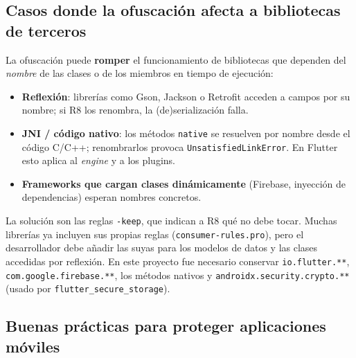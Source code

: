 \documentclass[12pt,letterpaper]{article}
\begin{document}
\subsection{Casos donde la ofuscación afecta a bibliotecas de terceros}

La ofuscación puede \textbf{romper} el funcionamiento de bibliotecas que dependen
del \emph{nombre} de las clases o de los miembros en tiempo de ejecución:

\begin{itemize}[leftmargin=1.4em]
  \item \textbf{Reflexión}: librerías como Gson, Jackson o Retrofit acceden a
        campos por su nombre; si R8 los renombra, la (de)serialización falla.
  \item \textbf{JNI / código nativo}: los métodos \texttt{native} se resuelven
        por nombre desde el código C/C++; renombrarlos provoca
        \texttt{UnsatisfiedLinkError}. En Flutter esto aplica al \emph{engine} y
        a los plugins.
  \item \textbf{Frameworks que cargan clases dinámicamente} (Firebase, inyección
        de dependencias) esperan nombres concretos.
\end{itemize}

La solución son las reglas \texttt{-keep}, que indican a R8 qué no debe tocar.
Muchas librerías ya incluyen sus propias reglas (\texttt{consumer-rules.pro}),
pero el desarrollador debe añadir las suyas para los modelos de datos y las
clases accedidas por reflexión. En este proyecto fue necesario conservar
\texttt{io.flutter.**}, \texttt{com.google.firebase.**}, los métodos nativos y
\texttt{androidx.security.crypto.**} (usado por \texttt{flutter\_secure\_storage}).

\subsection{Buenas prácticas para proteger aplicaciones móviles}
\end{document}
